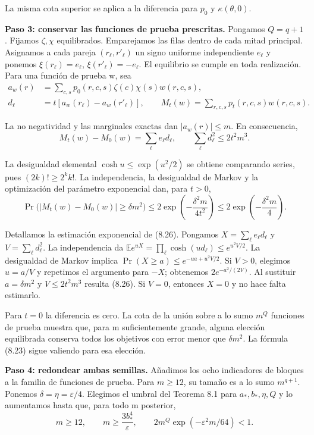 \documentclass[spanish,11pt,a4paper]{article}
\begin{document}
La misma cota superior se aplica a la diferencia para \(p_0\) y \(\kappa(\theta,0)\).

\textbf{Paso 3: conservar las funciones de prueba prescritas.} Pongamos \(Q=q+1\). Fijamos \(\zeta,\chi\) equilibrados. Emparejamos las filas dentro de cada mitad principal. Asignamos a cada pareja \((r_\ell,r'_\ell)\) un signo uniforme independiente \(e_\ell\) y ponemos \(\xi(r_\ell)=e_\ell\), \(\xi(r'_\ell)=-e_\ell\). El equilibrio se cumple en toda realización. Para una función de prueba w, sea
\[\begin{aligned}
a_w(r)&=\sum_{c,s}p_0(r,c,s)\zeta(c)\chi(s)w(r,c,s),\\
d_\ell&=t[a_w(r_\ell)-a_w(r'_\ell)],\qquad
M_t(w)=\sum_{r,c,s}p_t(r,c,s)w(r,c,s).
\end{aligned}\]

La no negatividad y las marginales exactas dan \(|a_w(r)|\leq m\). En consecuencia,
\[M_t(w)-M_0(w)=\sum_\ell e_\ell d_\ell,\qquad
\sum_\ell d_\ell^2\leq2t^2m^3.                              \tag{8.25}\]

La desigualdad elemental \(\cosh u\leq\exp(u^2/2)\) se obtiene comparando series, pues \((2k)!\geq2^k k!\). La independencia, la desigualdad de Markov y la optimización del parámetro exponencial dan, para \(t>0\),
\[\Pr\bigl(|M_t(w)-M_0(w)|\geq\delta m^2\bigr)
\leq2\exp\left(-\frac{\delta^2m}{4t^2}\right)
\leq2\exp\left(-\frac{\delta^2m}{4}\right).                  \tag{8.26}\]

Detallamos la estimación exponencial de (8.26). Pongamos \(X=\sum_\ell e_\ell d_\ell\) y \(V=\sum_\ell d_\ell^2\). La independencia da \(\mathbb E e^{uX}=\prod_\ell\cosh(ud_\ell)\leq e^{u^2V/2}\). La desigualdad de Markov implica \(\Pr(X\geq a)\leq e^{-ua+u^2V/2}\). Si \(V>0\), elegimos \(u=a/V\) y repetimos el argumento para \(-X\); obtenemos \(2e^{-a^2/(2V)}\). Al sustituir \(a=\delta m^2\) y \(V\leq2t^2m^3\) resulta (8.26). Si \(V=0\), entonces \(X=0\) y no hace falta estimarlo.

Para \(t=0\) la diferencia es cero. La cota de la unión sobre a lo sumo \(m^Q\) funciones de prueba muestra que, para m suficientemente grande, alguna elección equilibrada conserva todos los objetivos con error menor que \(\delta m^2\). La fórmula (8.23) sigue valiendo para esa elección.

\textbf{Paso 4: redondear ambas semillas.} Añadimos los ocho indicadores de bloques a la familia de funciones de prueba. Para \(m\geq12\), su tamaño es a lo sumo \(m^{q+1}\). Ponemos \(\delta=\eta=\varepsilon/4\). Elegimos el umbral del Teorema 8.1 para \(a_*,b_*,\eta,Q\) y lo aumentamos hasta que, para todo m posterior,
\[m\geq12,\qquad m\geq\frac{3b_*^4}{\varepsilon},\qquad
2m^Q\exp(-\varepsilon^2m/64)<1.                              \tag{8.27}\]
\end{document}
